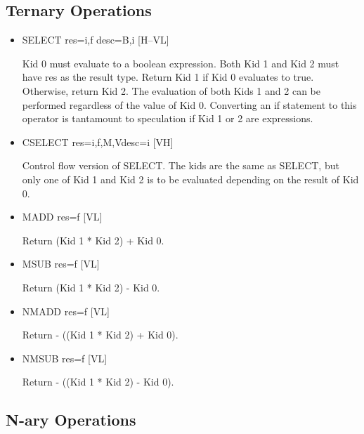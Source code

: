 \documentclass{article}
\begin{document}
\subsection{Ternary Operations}

\begin{itemize}
\item  SELECT res=i,f desc=B,i \hfill [H--VL]

Kid 0 must evaluate to a boolean expression. Both Kid 1 and Kid 2
must have res as the result type. Return Kid 1 if Kid 0 evaluates
to true. Otherwise, return Kid 2. The evaluation of both Kids 1
and 2 can be performed regardless of the value of Kid 0. Converting
an if statement to this operator is tantamount to speculation if
Kid 1 or 2 are expressions. 

\item  CSELECT res=i,f,M,Vdesc=i \hfill [VH]

Control flow version of SELECT. The kids are the same as SELECT,
but only one of Kid 1 and Kid 2 is to be evaluated depending on the
result of
Kid 0. 

\item  MADD res=f [VL]

Return (Kid 1 * Kid 2) + Kid 0.

\item  MSUB res=f [VL]

Return (Kid 1 * Kid 2) - Kid 0.

\item  NMADD res=f [VL]

Return - ((Kid 1 * Kid 2) + Kid 0).

\item  NMSUB res=f [VL]

Return - ((Kid 1 * Kid 2) - Kid 0).
\end{itemize}

\subsection{N-ary Operations}
\end{document}
